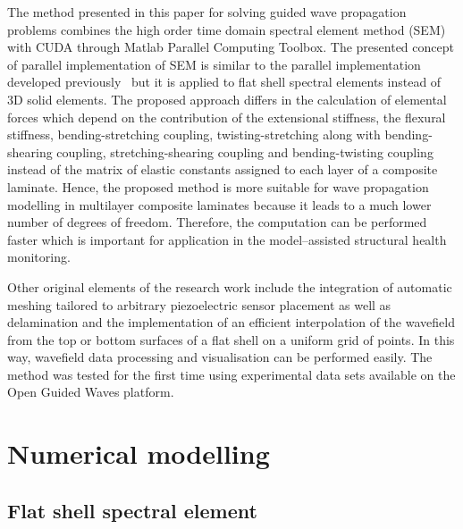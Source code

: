 \documentclass[12pt]{iopart}
\begin{document}
The method presented in this paper for solving guided wave propagation problems combines the high order time domain spectral element method (SEM) with CUDA through Matlab Parallel Computing Toolbox. The presented concept of parallel implementation of SEM is similar to the parallel implementation developed previously~\cite{Kudela2016} but it is applied to flat shell spectral elements instead of 3D solid elements. The proposed approach differs in the calculation of elemental forces which depend on the contribution of the extensional stiffness, the flexural stiffness, bending-stretching coupling,  twisting-stretching along with bending-shearing coupling, stretching-shearing coupling and bending-twisting coupling instead of the matrix of elastic constants assigned to each layer of a composite laminate. Hence, the proposed method is more suitable for wave propagation modelling in multilayer composite laminates because it leads to a much lower number of degrees of freedom. Therefore, the computation can be performed faster which is important for application in the model--assisted structural health monitoring. 

Other original elements of the research work include the integration of automatic meshing tailored to arbitrary piezoelectric sensor placement as well as delamination and the implementation of an efficient interpolation of the wavefield from the top or bottom surfaces of a flat shell on a uniform grid of points. In this way, wavefield data processing and visualisation can be performed easily. The method was tested for the first time using experimental data sets available on the Open Guided Waves platform.

\section{Numerical modelling}

\subsection{Flat shell spectral element}
\end{document}
